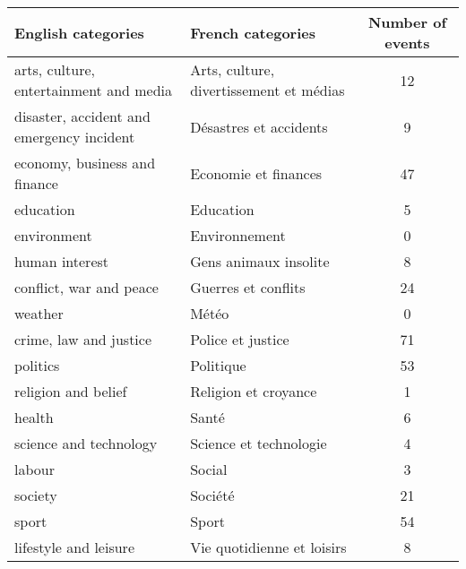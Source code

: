 \begin{tabular}{llc}
\toprule
                        English categories &                        French categories &  Number of events \\
\midrule
    arts, culture, entertainment and media &  Arts, culture, divertissement et médias &                12 \\
 disaster, accident and emergency incident &                   Désastres et accidents &                 9 \\
             economy, business and finance &                     Economie et finances &                47 \\
                                 education &                                Education &                 5 \\
                               environment &                            Environnement &                 0 \\
                            human interest &                    Gens animaux insolite &                 8 \\
                   conflict, war and peace &                      Guerres et conflits &                24 \\
                                   weather &                                    Météo &                 0 \\
                    crime, law and justice &                        Police et justice &                71 \\
                                  politics &                                Politique &                53 \\
                       religion and belief &                     Religion et croyance &                 1 \\
                                    health &                                    Santé &                 6 \\
                    science and technology &                   Science et technologie &                 4 \\
                                    labour &                                   Social &                 3 \\
                                   society &                                  Société &                21 \\
                                     sport &                                    Sport &                54 \\
                     lifestyle and leisure &               Vie quotidienne et loisirs &                 8 \\
\bottomrule
\end{tabular}
